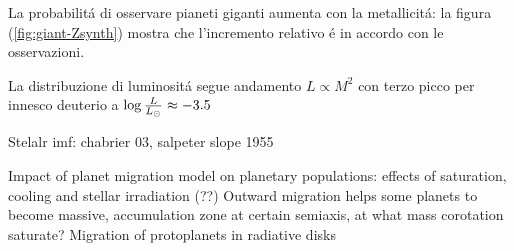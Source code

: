 La probabilit\'a di osservare pianeti giganti aumenta con la metallicit\'a: la figura (\ref{fig:giant-Zsynth}) mostra che l'incremento relativo \'e in accordo con le osservazioni.

\begin{workout}
	La distribuzione di luminosit\'a segue andamento $L\propto M^2$ con terzo picco per innesco deuterio a $\log{\frac{L}{L_{\odot}}}\approx-3.5$
\end{workout}

\begin{workout}[Relazione $M_p$ vs $Z_p$]
	
\end{workout}

\begin{workout}
	
\end{workout}

\begin{workout}

\end{workout}

\begin{workout}
Stelalr imf: chabrier 03, salpeter slope 1955
\end{workout}




\begin{workout}
Impact of planet migration model on planetary populations: effects of saturation, cooling and stellar irradiation (??)
Outward migration helps some planets to become massive, accumulation zone at certain semiaxis, at what mass corotation saturate?
Migration of protoplanets in radiative disks
\end{workout}
